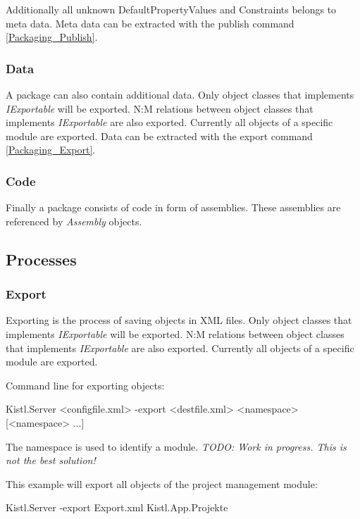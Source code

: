 Additionally all unknown DefaultPropertyValues and Constraints belongs to meta data.
Meta data can be extracted with the publish command \ref{Packaging_Publish}.

\subsubsection{\label{Packaging_Data}Data}

A package can also contain additional data. Only object classes that implements \emph{IExportable} will be exported. 
N:M relations between object classes that implements \emph{IExportable} are also exported. 
Currently all objects of a specific module are exported.
Data can be extracted with the export command \ref{Packaging_Export}.

\subsubsection{\label{Packaging_Code}Code}

Finally a package consists of code in form of assemblies. These assemblies are referenced by \emph{Assembly} objects.

\subsection{\label{Packaging_Processes}Processes}

\subsubsection{\label{Packaging_Export}Export}

Exporting is the process of saving objects in XML files. Only object classes that implements \emph{IExportable} will be exported. 
N:M relations between object classes that implements \emph{IExportable} are also exported. 
Currently all objects of a specific module are exported.

Command line for exporting objects:
\begin{CS}
Kistl.Server <configfile.xml> -export <destfile.xml> <namespace> [<namespace> ...]
\end{CS}

The namespace is used to identify a module. \emph{TODO: Work in progress. This is not the best solution!}
\par

This example will export all objects of the project management module:
\begin{CS}
Kistl.Server -export Export.xml Kistl.App.Projekte
\end{CS}

